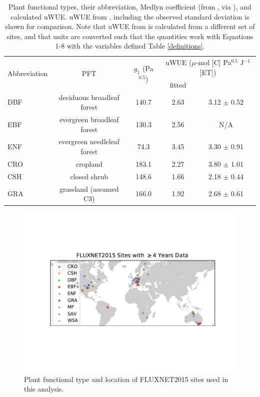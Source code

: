 \documentclass[draft,linenumbers]{agujournal}
\begin{document}
\begin{table}
  \caption{Plant functional types, their abbreviation, Medlyn
coefficient (from \citet{Lin_2015}, via \citet{Franks_2017}), and
calculated uWUE. uWUE from \citet{Zhou_2015}, including the observed
standard deviation is shown for comparison. Note that uWUE from
\citet{Zhou_2015} is calculated from a different set of sites, and
that units are converted such that the quantities work with Equations
1-8 with the variables defined Table \ref{definitions}.}  \small
\label{pft} \centering
\begin{tabular}{l c c @{\qquad} c c} \hline
\multirow{2}[3]{*}{Abbreviation} & \multirow{2}[3]{*}{PFT} &
\multirow{2}[3]{*}{$g_1$ (Pa$^{0.5}$)} & \multicolumn{2}{c}{uWUE
($\mu$-mol [C] Pa$^{0.5}$ J$^{-1}$ [ET])} \\ \cmidrule{4-5}

  & & & fitted & \citet{Zhou_2015} \\

  \hline DBF & deciduous broadleaf forest & 140.7 & 2.63 & 3.12 $\pm$
0.52 \\ EBF & evergreen broadleaf forest & 130.3 & 2.56 & N/A \\ ENF &
evergreen needleleaf forest & 74.3 & 3.45 & 3.30 $\pm$ 0.91 \\ CRO &
cropland & 183.1 & 2.27 & 3.80 $\pm$ 1.01 \\ CSH & closed shrub &
148.6 & 1.66 & 2.18 $\pm$ 0.44 \\ GRA & grassland (assumed C3) & 166.0
& 1.92 & 2.68 $\pm$ 0.61 \\ \hline
\end{tabular}
\end{table}


\begin{figure} \centering
\includegraphics[width=\textwidth]{./map.pdf}
\caption{Plant functional type and location of FLUXNET2015 sites used
in this analysis.}
\label{map_fig}
 \end{figure}
\end{document}
